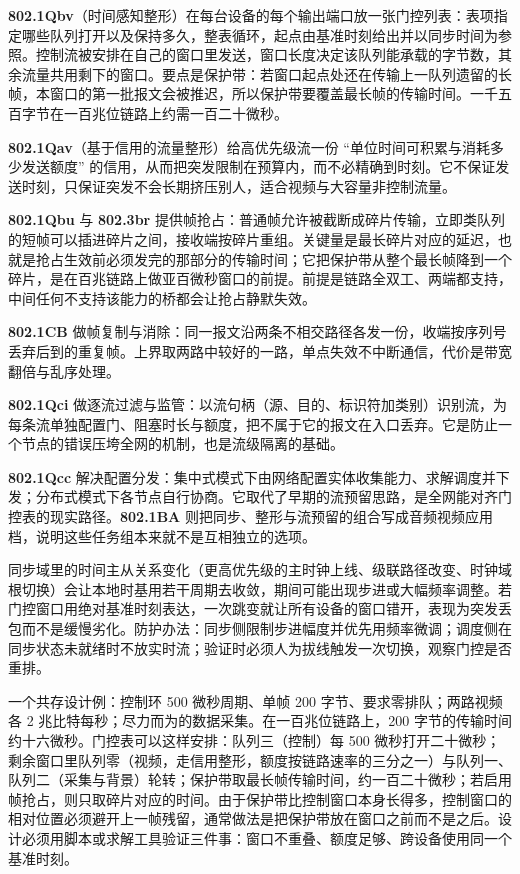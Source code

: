\documentclass[12pt,a4paper,fontset=fandol]{ctexbook}
\begin{document}
\textbf{802.1Qbv}（时间感知整形）在每台设备的每个输出端口放一张门控列表：表项指定哪些队列打开以及保持多久，整表循环，起点由基准时刻给出并以同步时间为参照。控制流被安排在自己的窗口里发送，窗口长度决定该队列能承载的字节数，其余流量共用剩下的窗口。要点是保护带：若窗口起点处还在传输上一队列遗留的长帧，本窗口的第一批报文会被推迟，所以保护带要覆盖最长帧的传输时间。一千五百字节在一百兆位链路上约需一百二十微秒。

\textbf{802.1Qav}（基于信用的流量整形）给高优先级流一份 ``单位时间可积累与消耗多少发送额度'' 的信用，从而把突发限制在预算内，而不必精确到时刻。它不保证发送时刻，只保证突发不会长期挤压别人，适合视频与大容量非控制流量。

\textbf{802.1Qbu} 与 \textbf{802.3br} 提供帧抢占：普通帧允许被截断成碎片传输，立即类队列的短帧可以插进碎片之间，接收端按碎片重组。关键量是最长碎片对应的延迟，也就是抢占生效前必须发完的那部分的传输时间；它把保护带从整个最长帧降到一个碎片，是在百兆链路上做亚百微秒窗口的前提。前提是链路全双工、两端都支持，中间任何不支持该能力的桥都会让抢占静默失效。

\textbf{802.1CB} 做帧复制与消除：同一报文沿两条不相交路径各发一份，收端按序列号丢弃后到的重复帧。上界取两路中较好的一路，单点失效不中断通信，代价是带宽翻倍与乱序处理。

\textbf{802.1Qci} 做逐流过滤与监管：以流句柄（源、目的、标识符加类别）识别流，为每条流单独配置门、阻塞时长与额度，把不属于它的报文在入口丢弃。它是防止一个节点的错误压垮全网的机制，也是流级隔离的基础。

\textbf{802.1Qcc} 解决配置分发：集中式模式下由网络配置实体收集能力、求解调度并下发；分布式模式下各节点自行协商。它取代了早期的流预留思路，是全网能对齐门控表的现实路径。\textbf{802.1BA} 则把同步、整形与流预留的组合写成音频视频应用档，说明这些任务组本来就不是互相独立的选项。

\begin{warning}[title={时间源切换时的跳变会污染控制环}]
同步域里的时间主从关系变化（更高优先级的主时钟上线、级联路径改变、时钟域根切换）会让本地时基用若干周期去收敛，期间可能出现步进或大幅频率调整。若门控窗口用绝对基准时刻表达，一次跳变就让所有设备的窗口错开，表现为突发丢包而不是缓慢劣化。防护办法：同步侧限制步进幅度并优先用频率微调；调度侧在同步状态未就绪时不放实时流；验证时必须人为拔线触发一次切换，观察门控是否重排。
\end{warning}

一个共存设计例：控制环 500 微秒周期、单帧 200 字节、要求零排队；两路视频各 2 兆比特每秒；尽力而为的数据采集。在一百兆位链路上，200 字节的传输时间约十六微秒。门控表可以这样安排：队列三（控制）每 500 微秒打开二十微秒；剩余窗口里队列零（视频，走信用整形，额度按链路速率的三分之一）与队列一、队列二（采集与背景）轮转；保护带取最长帧传输时间，约一百二十微秒；若启用帧抢占，则只取碎片对应的时间。由于保护带比控制窗口本身长得多，控制窗口的相对位置必须避开上一帧残留，通常做法是把保护带放在窗口之前而不是之后。设计必须用脚本或求解工具验证三件事：窗口不重叠、额度足够、跨设备使用同一个基准时刻。
\end{document}
